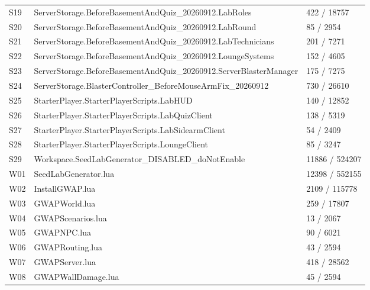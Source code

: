 \begin{longtable}{p{}p{}p{}}
S19 & ServerStorage.\allowbreak{}BeforeBasementAndQuiz\_\allowbreak{}20260912.\allowbreak{}LabRoles & 422 /\allowbreak{} 18757 \\
S20 & ServerStorage.\allowbreak{}BeforeBasementAndQuiz\_\allowbreak{}20260912.\allowbreak{}LabRound & 85 /\allowbreak{} 2954 \\
S21 & ServerStorage.\allowbreak{}BeforeBasementAndQuiz\_\allowbreak{}20260912.\allowbreak{}LabTechnicians & 201 /\allowbreak{} 7271 \\
S22 & ServerStorage.\allowbreak{}BeforeBasementAndQuiz\_\allowbreak{}20260912.\allowbreak{}LoungeSystems & 152 /\allowbreak{} 4605 \\
S23 & ServerStorage.\allowbreak{}BeforeBasementAndQuiz\_\allowbreak{}20260912.\allowbreak{}ServerBlasterManager & 175 /\allowbreak{} 7275 \\
S24 & ServerStorage.\allowbreak{}BlasterController\_\allowbreak{}BeforeMouseArmFix\_\allowbreak{}20260912 & 730 /\allowbreak{} 26610 \\
S25 & StarterPlayer.\allowbreak{}StarterPlayerScripts.\allowbreak{}LabHUD & 140 /\allowbreak{} 12852 \\
S26 & StarterPlayer.\allowbreak{}StarterPlayerScripts.\allowbreak{}LabQuizClient & 138 /\allowbreak{} 5319 \\
S27 & StarterPlayer.\allowbreak{}StarterPlayerScripts.\allowbreak{}LabSidearmClient & 54 /\allowbreak{} 2409 \\
S28 & StarterPlayer.\allowbreak{}StarterPlayerScripts.\allowbreak{}LoungeClient & 85 /\allowbreak{} 3247 \\
S29 & Workspace.\allowbreak{}SeedLabGenerator\_\allowbreak{}DISABLED\_\allowbreak{}doNotEnable & 11886 /\allowbreak{} 524207 \\
W01 & SeedLabGenerator.\allowbreak{}lua & 12398 /\allowbreak{} 552155 \\
W02 & InstallGWAP.\allowbreak{}lua & 2109 /\allowbreak{} 115778 \\
W03 & GWAPWorld.\allowbreak{}lua & 259 /\allowbreak{} 17807 \\
W04 & GWAPScenarios.\allowbreak{}lua & 13 /\allowbreak{} 2067 \\
W05 & GWAPNPC.\allowbreak{}lua & 90 /\allowbreak{} 6021 \\
W06 & GWAPRouting.\allowbreak{}lua & 43 /\allowbreak{} 2594 \\
W07 & GWAPServer.\allowbreak{}lua & 418 /\allowbreak{} 28562 \\
W08 & GWAPWallDamage.\allowbreak{}lua & 45 /\allowbreak{} 2594 \\

\end{longtable}
